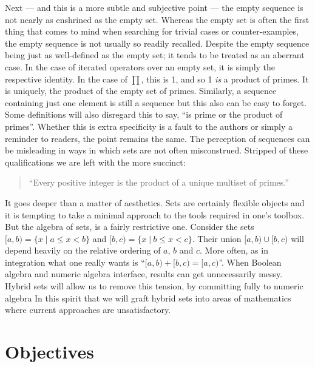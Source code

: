 Next --- and this is a more subtle and subjective point --- 
the empty sequence is not nearly as enshrined as the empty set.
Whereas the empty set is often the first thing that comes to mind when searching for trivial cases or counter-examples,
the empty sequence is not usually so readily recalled.
Despite the empty sequence being just as well-defined as the empty set; it tends to be treated as an aberrant case.
In the case of iterated operators over an empty set, it is simply the respective identity.
In the case of $\prod$, this is 1, and so 1 \emph{is} a product of primes.
It is uniquely, the product of the empty set of primes.
Similarly, a sequence containing just one element is still a sequence but this also can be easy to forget.
Some definitions will also disregard this to say, ``is prime or the product of primes''. 
Whether this is extra specificity is a fault to the authors or simply a reminder to readers, the point remains the same.
The perception of sequences can be misleading in ways in which sets are not often misconstrued.
Stripped of these qualifications we are left with the more succinct:
\begin{quote}
	``Every positive integer is the product of a unique multiset of primes.''
\end{quote}


It goes deeper than a matter of aesthetics. 
Sets are certainly flexible objects and it is tempting to take a minimal approach to the tools required in one's toolbox.
But the algebra of sets, is a fairly restrictive one.
Consider the sets $[a,b) = \{ x \; |\; a \leq x < b \}$ and $[b,c) = \{ x \;|\: b \leq x < c \}$.
Their union $[a,b) \cup [b,c)$ will depend heavily on the relative ordering of $a$, $b$ and $c$. 
More often, as in integration what one really wants is ``$[a,b) + [b,c) = [a,c)$''.
When Boolean algebra and numeric algebra interface, results can get unnecessarily messy.
Hybrid sets will allow us to remove this tension, by committing fully to numeric algebra
In this spirit that we will graft hybrid sets into areas of mathematics where current approaches are unsatisfactory.





\section{Objectives}


